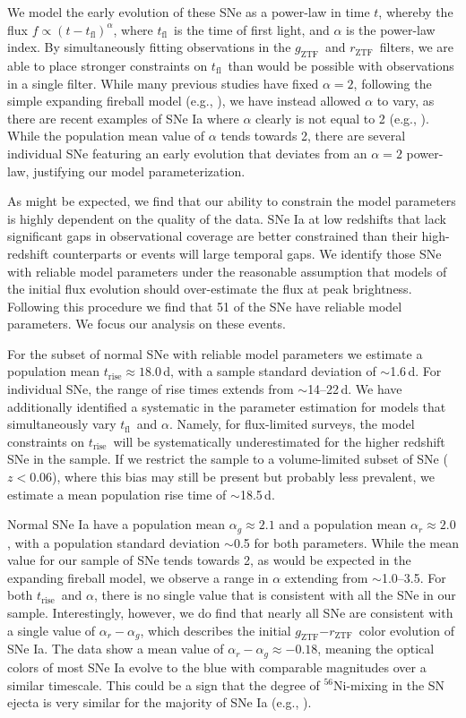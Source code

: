 \documentclass[twocolumn]{./aastex63}
\newcommand{\rztf}{$r_\mathrm{ZTF}$}
\newcommand{\gztf}{$g_\mathrm{ZTF}$}
\newcommand{\tfl}{$t_\mathrm{fl}$}
\newcommand{\trise}{$t_\mathrm{rise}$}
\begin{document}
We model the early evolution of these SNe as a power-law in time $t$, whereby
the flux $f \propto (t - t_\mathrm{fl})^\alpha$, where \tfl\ is the time of
first light, and $\alpha$ is the power-law index. By simultaneously fitting
observations in the \gztf\ and \rztf\ filters, we are able to place stronger
constraints on \tfl\ than would be possible with observations in a single
filter. While many previous studies have fixed $\alpha = 2$, following the
simple expanding fireball model (e.g., \citealt{Riess99a}), we have instead
allowed $\alpha$ to vary, as there are recent examples of SNe Ia where
$\alpha$ clearly is not equal to 2 (e.g.,
\citealt{Zheng13,Miller18,Shappee19,Dimitriadis19}). While the population mean
value of $\alpha$ tends towards 2, there are several individual SNe featuring
an early evolution that deviates from an $\alpha = 2$ power-law, justifying
our model parameterization.

As might be expected, we find that our ability to constrain the model
parameters is highly dependent on the quality of the data. SNe Ia at low
redshifts that lack significant gaps in observational coverage are better
constrained than their high-redshift counterparts or events will large
temporal gaps. We identify those SNe with reliable model parameters under the
reasonable assumption that models of the initial flux evolution should
over-estimate the flux at peak brightness. Following this procedure we find
that 51 of the SNe have reliable model parameters. We focus our analysis on
these events.

For the subset of normal SNe with reliable model parameters we estimate a
population mean \trise\;$\approx 18.0$\,d, with a sample standard deviation of
$\sim$1.6\,d. For individual SNe, the range of rise times extends from
$\sim$14--22\,d. We have additionally identified a systematic in the parameter
estimation for models that simultaneously vary \tfl\ and $\alpha$. Namely, for
flux-limited surveys, the model constraints on \trise\ will be systematically
underestimated for the higher redshift SNe in the sample. If we restrict the
sample to a volume-limited subset of SNe ($z < 0.06$), where this bias may
still be present but probably less prevalent, we estimate a mean population
rise time of $\sim$18.5\,d.

Normal SNe Ia have a population mean $\alpha_g \approx 2.1$ and a population
mean $\alpha_r \approx 2.0$, with a population standard deviation $\sim$0.5
for both parameters. While the mean value for our sample of SNe tends towards
2, as would be expected in the expanding fireball model, we observe a range in
$\alpha$ extending from $\sim$1.0--3.5. For both \trise\ and $\alpha$, there
is no single value that is consistent with all the SNe in our sample.
Interestingly, however, we do find that nearly all SNe are consistent with a
single value of $\alpha_r - \alpha_g$, which describes the initial \gztf$ -
$\rztf\ color evolution of SNe Ia. The data show a mean value of $\alpha_r -
\alpha_g \approx -0.18$, meaning the optical colors of most SNe Ia evolve to
the blue with comparable magnitudes over a similar timescale. This could be a
sign that the degree of $^{56}$Ni-mixing in the SN ejecta is very similar for
the majority of SNe Ia (e.g., \citealt{Piro16,Magee18,Magee19}).
\end{document}
